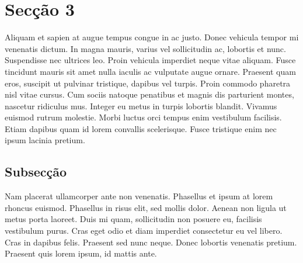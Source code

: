 \section{Secção 3}
\label{sec3}
Aliquam et sapien at augue tempus congue in ac justo. Donec vehicula tempor mi venenatis dictum. In magna mauris, varius vel sollicitudin ac, lobortis et nunc. Suspendisse nec ultrices leo. Proin vehicula imperdiet neque vitae aliquam. Fusce tincidunt mauris sit amet nulla iaculis ac vulputate augue ornare. Praesent quam eros, suscipit ut pulvinar tristique, dapibus vel turpis. Proin commodo pharetra nisl vitae cursus. Cum sociis natoque penatibus et magnis dis parturient montes, nascetur ridiculus mus. Integer eu metus in turpis lobortis blandit. Vivamus euismod rutrum molestie. Morbi luctus orci tempus enim vestibulum facilisis. Etiam dapibus quam id lorem convallis scelerisque. Fusce tristique enim nec ipsum lacinia pretium.

\subsection{Subsecção}

Nam placerat ullamcorper ante non venenatis. Phasellus et ipsum at lorem rhoncus euismod. Phasellus in risus elit, sed mollis dolor. Aenean non ligula ut metus porta laoreet. Duis mi quam, sollicitudin non posuere eu, facilisis vestibulum purus. Cras eget odio et diam imperdiet consectetur eu vel libero. Cras in dapibus felis. Praesent sed nunc neque. Donec lobortis venenatis pretium. Praesent quis lorem ipsum, id mattis ante. 

